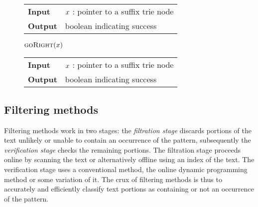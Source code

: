 \begin{figure*}
\begin{minipage}[t]{.5\textwidth}
\begin{algorithm}[H]
\begin{tabular}{ll}
\textbf{Input}  & $x$ : pointer to a suffix trie node\\
\textbf{Output} & boolean indicating success\\
\end{tabular}
\begin{algorithmic}[1]
	\State \Return \False
\EndIf
{}
	\State \Return \True
\Else
	\State \Return $\Call{goRight}{$\Tn$}$		
\EndIf
\end{algorithmic}
\label{alg:st-godown}
\end{algorithm}
\end{minipage}
\hfill
\begin{minipage}[t]{.5\textwidth}
\begin{algorithm}[H]
\begin{tabular}{ll}
\textbf{Input}  & $x$ : pointer to a suffix trie node\\
\textbf{Output} & boolean indicating success\\
\end{tabular}
\begin{algorithmic}[1]
			\State \Return \True
		\EndIf
	\EndWhile
\EndIf
\State \Return \False
\end{algorithmic}
\label{alg:st-goright}
\end{algorithm}
\end{minipage}
\end{figure*}



\subsection{Filtering methods}
\label{sec:intro:filtering}

Filtering methods work in two stages: the \emph{filtration stage} discards portions of the text unlikely or unable to contain an occurrence of the pattern, subsequently the \emph{verification stage} checks the remaining portions.
The filtration stage proceeds online by scanning the text or alternatively offline using an index of the text.
The verification stage uses a conventional method, \eg the online dynamic programming method or some variation of it.
The crux of filtering methods is thus to accurately and efficiently classify text portions as containing or not an occurrence of the pattern.

